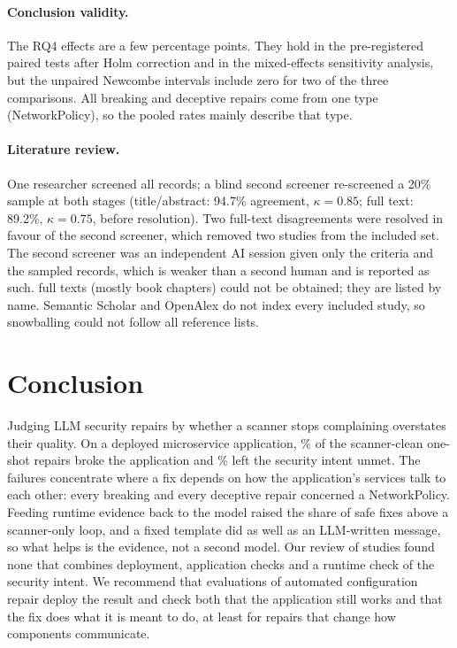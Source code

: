 \documentclass[10pt]{article}
\begin{document}
\paragraph{Conclusion validity.} The RQ4 effects are a few percentage points. They hold in the pre-registered paired
tests after Holm correction and in the mixed-effects sensitivity analysis, but the unpaired Newcombe intervals include
zero for two of the three comparisons. All breaking and deceptive repairs come from one type (NetworkPolicy), so the
pooled rates mainly describe that type.

\paragraph{Literature review.} One researcher screened all records; a blind second screener re-screened a 20\% sample
at both stages (title/abstract: 94.7\% agreement, $\kappa=0.85$; full text: 89.2\%, $\kappa=0.75$, before resolution).
Two full-text disagreements were resolved in favour of the second screener, which removed two studies from the included
set. The second screener was an independent AI session given only the criteria and the sampled records, which is weaker
than a second human and is reported as such. \LitNotRetrieved{} full texts (mostly book chapters) could not be obtained; they are listed by name. Semantic Scholar and OpenAlex do not index every included study, so
snowballing could not follow all reference lists.

\section{Conclusion}
Judging LLM security repairs by whether a scanner stops complaining overstates their quality. On a deployed
microservice application, \WzeroCzeroViewOfWhichBreakingPct\% of the scanner-clean one-shot repairs broke the
application and \WzeroCzeroViewOfWhichDeceptivePct\% left the security intent unmet. The failures concentrate where a
fix depends on how the application's services talk to each other: every breaking and every deceptive repair concerned
a NetworkPolicy. Feeding runtime evidence back to the model raised the share of safe fixes above a scanner-only loop,
and a fixed template did as well as an LLM-written message, so what helps is the evidence, not a second model. Our
review of \LitIncluded{} studies found none that combines deployment, application checks and a runtime check of the
security intent. We recommend that evaluations of automated configuration repair deploy the result and check both that
the application still works and that the fix does what it is meant to do, at least for repairs that change how
components communicate.
\end{document}

